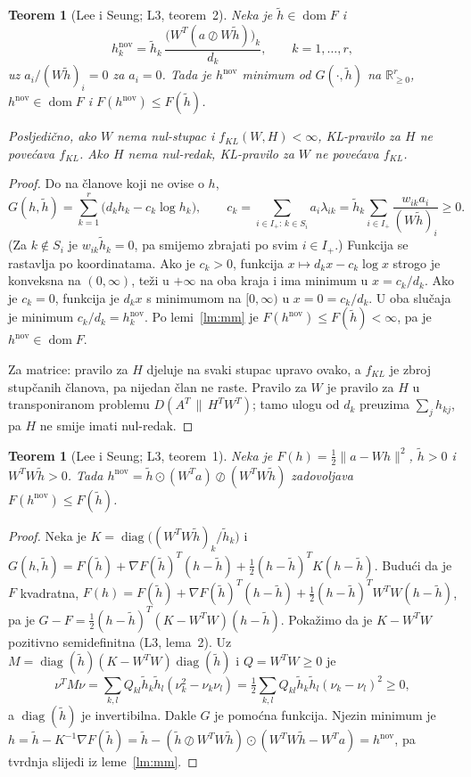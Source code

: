 \documentclass[11pt,a4paper]{article}
\theoremstyle{definition}
\theoremstyle{plain}
\newtheorem{teorem}[definicija]{Teorem}
\theoremstyle{remark}
\newcommand{\Rp}{\mathbb{R}_{\geq 0}}
\newcommand{\Dkl}[2]{D(#1\,\|\,#2)}
\DeclareMathOperator{\diag}{diag}
\DeclareMathOperator{\dom}{dom}
\begin{document}
\begin{teorem}[Lee i Seung; L3, teorem~2]\label{tm:kl-monotonost}
Neka je $\tilde h\in\dom F$ i
\[
  h^{\mathrm{nov}}_k=\tilde h_k\,\frac{\bigl(W^T(a\oslash W\tilde h)\bigr)_k}{d_k},
  \qquad k=1,\dots,r,
\]
uz $a_i/(W\tilde h)_i=0$ za $a_i=0$. Tada je $h^{\mathrm{nov}}$ minimum od $G(\cdot,\tilde h)$ na
$\Rp^r$, $h^{\mathrm{nov}}\in\dom F$ i $F(h^{\mathrm{nov}})\leq F(\tilde h)$.

Posljedično, ako $W$ nema nul-stupac i $f_{KL}(W,H)<\infty$, KL-pravilo za $H$ ne povećava
$f_{KL}$. Ako $H$ nema nul-redak, KL-pravilo za $W$ ne povećava $f_{KL}$.
\end{teorem}
\begin{proof}
Do na članove koji ne ovise o $h$,
\[
  G(h,\tilde h)=\sum_{k=1}^r\bigl(d_kh_k-c_k\log h_k\bigr),\qquad
  c_k=\sum_{i\in I_+:\,k\in S_i}a_i\lambda_{ik}=\tilde h_k\sum_{i\in I_+}\frac{w_{ik}a_i}{(W\tilde h)_i}\geq0 .
\]
(Za $k\notin S_i$ je $w_{ik}\tilde h_k=0$, pa smijemo zbrajati po svim $i\in I_+$.) Funkcija se
rastavlja po koordinatama. Ako je $c_k>0$, funkcija $x\mapsto d_kx-c_k\log x$ strogo je konveksna na
$(0,\infty)$, teži u $+\infty$ na oba kraja i ima minimum u $x=c_k/d_k$. Ako je $c_k=0$, funkcija je
$d_kx$ s minimumom na $[0,\infty)$ u $x=0=c_k/d_k$. U oba slučaja je minimum $c_k/d_k=h_k^{\mathrm{nov}}$.
Po lemi~\ref{lm:mm} je $F(h^{\mathrm{nov}})\leq F(\tilde h)<\infty$, pa je $h^{\mathrm{nov}}\in\dom F$.

Za matrice: pravilo za $H$ djeluje na svaki stupac upravo ovako, a $f_{KL}$ je zbroj stupčanih
članova, pa nijedan član ne raste. Pravilo za $W$ je pravilo za $H$ u transponiranom problemu
$\Dkl{A^T}{H^TW^T}$; tamo ulogu od $d_k$ preuzima $\sum_jh_{kj}$, pa $H$ ne smije imati nul-redak.
\end{proof}

\begin{teorem}[Lee i Seung; L3, teorem~1]\label{tm:frob-monotonost}
Neka je $F(h)=\frac12\|a-Wh\|^2$, $\tilde h>0$ i $W^TW\tilde h>0$. Tada
$h^{\mathrm{nov}}=\tilde h\odot(W^Ta)\oslash(W^TW\tilde h)$ zadovoljava $F(h^{\mathrm{nov}})\leq F(\tilde h)$.
\end{teorem}
\begin{proof}
Neka je $K=\diag\bigl((W^TW\tilde h)_k/\tilde h_k\bigr)$ i
$G(h,\tilde h)=F(\tilde h)+\nabla F(\tilde h)^T(h-\tilde h)+\frac12(h-\tilde h)^TK(h-\tilde h)$. Budući da
je $F$ kvadratna, $F(h)=F(\tilde h)+\nabla F(\tilde h)^T(h-\tilde h)+\frac12(h-\tilde h)^TW^TW(h-\tilde h)$,
pa je $G-F=\frac12(h-\tilde h)^T(K-W^TW)(h-\tilde h)$. Pokažimo da je $K-W^TW$ pozitivno
semidefinitna (L3, lema~2). Uz $M=\diag(\tilde h)(K-W^TW)\diag(\tilde h)$ i $Q=W^TW\geq0$ je
\[
  \nu^TM\nu=\sum_{k,l}Q_{kl}\tilde h_k\tilde h_l(\nu_k^2-\nu_k\nu_l)
  =\tfrac12\sum_{k,l}Q_{kl}\tilde h_k\tilde h_l(\nu_k-\nu_l)^2\geq0,
\]
a $\diag(\tilde h)$ je invertibilna. Dakle $G$ je pomoćna funkcija. Njezin minimum je
$h=\tilde h-K^{-1}\nabla F(\tilde h)=\tilde h-(\tilde h\oslash W^TW\tilde h)\odot(W^TW\tilde h-W^Ta)
=h^{\mathrm{nov}}$, pa tvrdnja slijedi iz leme~\ref{lm:mm}.
\end{proof}
\end{document}
